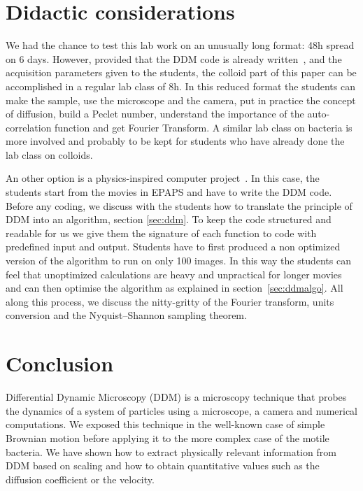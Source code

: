 \documentclass[prb,twocolumn,amsmath,amssymb]{revtex4-1}
\begin{document}
\section{Didactic considerations}
\label{sec:didac}
We had the chance to test this lab work on an unusually long format: 48h spread on 6 days. However, provided that the DDM code is already written~\cite{code_github}, and the acquisition parameters given to the students, the colloid part of this paper can be accomplished in a regular lab class of 8h. In this reduced format the students can make the sample, use the microscope and the camera, put in practice the concept of diffusion, build a Peclet number, understand the importance of the auto-correlation function and get Fourier Transform. A similar lab class on bacteria is more involved and probably to be kept for students who have already done the lab class on colloids.

An other option is a physics-inspired computer project~\cite{ajp2005spencer, ajp2014deutsh}. In this case, the students start from the movies in EPAPS and have to write the DDM code. Before any coding, we discuss with the students how to translate the principle of DDM into an algorithm, section \ref{sec:ddm}. To keep the code structured and readable for us we give them the signature of each function to code with predefined input and output. Students have to first produced a non optimized version of the algorithm to run on only 100 images. In this way the students can feel that unoptimized  calculations are heavy and unpractical for longer movies and can then optimise the algorithm as explained in section~\ref{sec:ddmalgo}. All along this process, we discuss the nitty-gritty of the Fourier transform, units conversion and the Nyquist–Shannon sampling theorem.

\section{Conclusion}
\label{sec:cl}
Differential Dynamic Microscopy (DDM) is a microscopy technique that probes the dynamics of a system of particles using a microscope, a camera and numerical computations. We exposed this technique in the well-known case of simple Brownian motion before applying it to the more complex case of the motile bacteria. We have shown how to extract physically relevant information from DDM based on scaling and how to obtain quantitative values such as the diffusion coefficient or the velocity.
\end{document}

